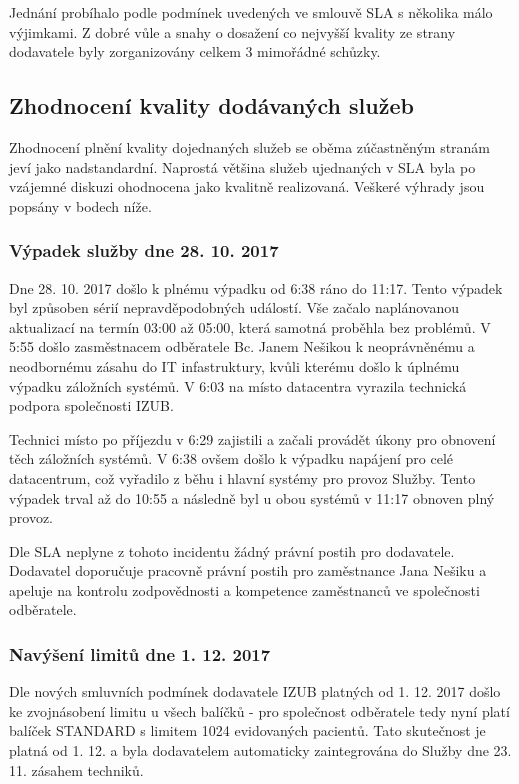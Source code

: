 \documentclass[11pt, a4paper, titlepage]{article}
\begin{document}
	Jednání probíhalo podle podmínek uvedených ve smlouvě SLA s několika málo výjimkami. Z dobré vůle a snahy o dosažení co nejvyšší kvality ze strany dodavatele byly zorganizovány celkem 3 mimořádné schůzky.

	\subsection{Zhodnocení kvality dodávaných služeb}

	Zhodnocení plnění kvality dojednaných služeb se oběma zúčastněným stranám jeví jako nadstandardní. Naprostá většina služeb ujednaných v SLA byla po vzájemné diskuzi ohodnocena jako kvalitně realizovaná. Veškeré výhrady jsou popsány v bodech níže.

	\subsubsection{Výpadek služby dne 28. 10. 2017}

	Dne 28. 10. 2017 došlo k plnému výpadku od 6:38 ráno do 11:17. Tento výpadek byl způsoben sérií nepravděpodobných událostí. Vše začalo naplánovanou aktualizací na termín 03:00 až 05:00, která samotná proběhla bez problémů. V 5:55 došlo zasměstnacem odběratele Bc. Janem Nešikou k neoprávněnému a neodbornému zásahu do IT infastruktury, kvůli kterému došlo k úplnému výpadku záložních systémů. V 6:03 na místo datacentra vyrazila technická podpora společnosti IZUB.

	Technici místo po příjezdu v 6:29 zajistili a začali provádět úkony pro obnovení těch záložních systémů. V 6:38 ovšem došlo k výpadku napájení pro celé datacentrum, což vyřadilo z běhu i hlavní systémy pro provoz Služby. Tento výpadek trval až do 10:55 a následně byl u obou systémů v 11:17 obnoven plný provoz.

	Dle SLA neplyne z tohoto incidentu žádný právní postih pro dodavatele. Dodavatel doporučuje pracovně právní postih pro zaměstnance Jana Nešiku a apeluje na kontrolu zodpovědnosti a kompetence zaměstnanců ve společnosti odběratele.

	\subsubsection{Navýšení limitů dne 1. 12. 2017}

	Dle nových smluvních podmínek dodavatele IZUB platných od 1. 12. 2017 došlo ke zvojnásobení limitu u všech balíčků - pro společnost odběratele tedy nyní platí balíček STANDARD s limitem 1024 evidovaných pacientů. Tato skutečnost je platná od 1. 12. a byla dodavatelem automaticky zaintegrována do Služby dne 23. 11. zásahem techniků.
\end{document}
